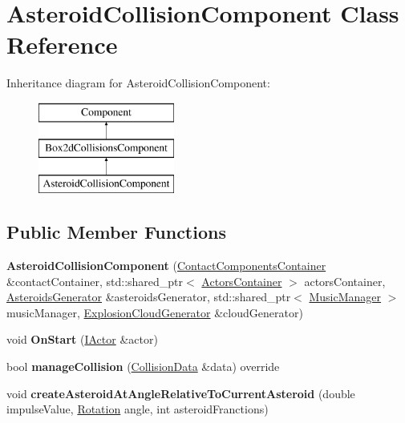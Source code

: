 \hypertarget{classAsteroidCollisionComponent}{}\section{Asteroid\+Collision\+Component Class Reference}
\label{classAsteroidCollisionComponent}
Inheritance diagram for Asteroid\+Collision\+Component\+:\begin{figure}[H]
\begin{center}
\leavevmode
\includegraphics[height=3.000000cm]{classAsteroidCollisionComponent}
\end{center}
\end{figure}
\subsection*{Public Member Functions}
\begin{DoxyCompactItemize}
\item 
{\bfseries Asteroid\+Collision\+Component} (\hyperlink{classContactComponentsContainer}{Contact\+Components\+Container} \&contact\+Container, std\+::shared\+\_\+ptr$<$ \hyperlink{classActorsContainer}{Actors\+Container} $>$ actors\+Container, \hyperlink{classAsteroidsGenerator}{Asteroids\+Generator} \&asteroids\+Generator, std\+::shared\+\_\+ptr$<$ \hyperlink{classMusicManager}{Music\+Manager} $>$ music\+Manager, \hyperlink{classExplosionCloudGenerator}{Explosion\+Cloud\+Generator} \&cloud\+Generator)\hypertarget{classAsteroidCollisionComponent_a9860abce070e21404cdce554cccb11c3}{}\label{classAsteroidCollisionComponent_a9860abce070e21404cdce554cccb11c3}

\item 
void {\bfseries On\+Start} (\hyperlink{classIActor}{I\+Actor} \&actor)\hypertarget{classAsteroidCollisionComponent_a49bdf342f29806ea409cffedb5634bfb}{}\label{classAsteroidCollisionComponent_a49bdf342f29806ea409cffedb5634bfb}

\item 
bool {\bfseries manage\+Collision} (\hyperlink{structCollisionData}{Collision\+Data} \&data) override\hypertarget{classAsteroidCollisionComponent_a5fb79649b4cb8c0f30a9f52960167ede}{}\label{classAsteroidCollisionComponent_a5fb79649b4cb8c0f30a9f52960167ede}

\item 
void {\bfseries create\+Asteroid\+At\+Angle\+Relative\+To\+Current\+Asteroid} (double impulse\+Value, \hyperlink{classRotation}{Rotation} angle, int asteroid\+Franctions)\hypertarget{classAsteroidCollisionComponent_a61f138ea05e94d9b3738b8b044d1905f}{}\label{classAsteroidCollisionComponent_a61f138ea05e94d9b3738b8b044d1905f}

\end{DoxyCompactItemize}
